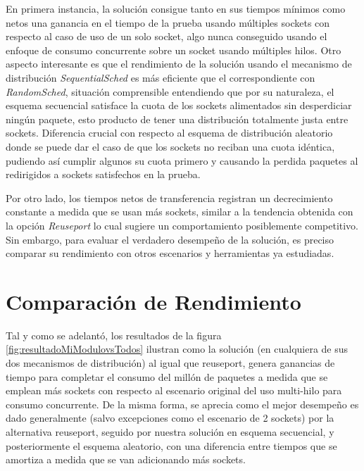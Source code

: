 En primera instancia, la solución consigue tanto en sus tiempos mínimos como netos una ganancia en el tiempo de la prueba usando múltiples sockets con respecto al caso de uso de un solo socket, algo nunca conseguido usando el enfoque de consumo concurrente sobre un socket usando múltiples hilos. Otro aspecto interesante es que el rendimiento de la solución usando el mecanismo de distribución \emph{SequentialSched} es más eficiente que el correspondiente con \emph{RandomSched}, situación comprensible entendiendo que por su naturaleza, el esquema secuencial satisface la cuota de los sockets alimentados sin desperdiciar ningún paquete, esto producto de tener una distribución totalmente justa entre sockets. Diferencia crucial con respecto al esquema de distribución aleatorio donde se puede dar el caso de que los sockets no reciban una cuota idéntica, pudiendo así cumplir algunos su cuota primero y causando la perdida paquetes al redirigidos a sockets satisfechos en la prueba.

Por otro lado, los tiempos netos de transferencia registran un decrecimiento constante a medida que se usan más sockets, similar a la tendencia obtenida con la opción \emph{Reuseport} lo cual sugiere un comportamiento posiblemente competitivo. Sin embargo, para evaluar el verdadero desempeño de la solución, es preciso comparar su rendimiento con otros escenarios y herramientas ya estudiadas.

\section{Comparación de Rendimiento}

Tal y como se adelantó, los resultados de la figura \ref{fig:resultadoMiModulovsTodos} ilustran como la solución (en cualquiera de sus dos mecanismos de distribución) al igual que reuseport, genera ganancias de tiempo para completar el consumo del millón de paquetes a medida que se emplean más sockets con respecto al escenario original del uso multi-hilo para consumo concurrente. De la misma forma, se aprecia como el mejor desempeño es dado generalmente (salvo excepciones como el escenario de 2 sockets) por la alternativa reuseport, seguido por nuestra solución en esquema secuencial, y posteriormente el esquema aleatorio, con una diferencia entre tiempos que se amortiza a medida que se van adicionando más sockets.

